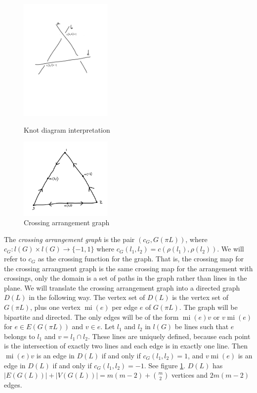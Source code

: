 \documentclass[11pt, oneside]{article}
\newcommand{\mi}{\operatorname{mi}}
\begin{document}
\begin{figure}
\begin{minipage}{0.5\linewidth}
\centering	
\includegraphics[width=0.4\textwidth]{Arrcross}
\caption{Knot diagram interpretation}
\label{fig:first}
\end{minipage}
\begin{minipage}{0.5\linewidth}
\centering
\includegraphics[width=0.4\textwidth]{Digraph}
\caption{Crossing arrangement graph}
\label{fig:second}
\end{minipage}
\end{figure}


The \emph{crossing arrangement graph} is the pair $(c_G, G(\pi L))$, where $c_G: l(G) \times l(G) \to \{-1,1\}$ where $c_G(l_1, l_2) = c(\rho(l_1), \rho(l_2))$. We will refer to $c_G$ as the crossing function for the graph. That is, the crossing map for the crossing arrangment graph is the same crossing map for the arrangement with crossings, only the domain is a set of paths in the graph rather than lines in the plane. We will translate the crossing arrangement graph into a directed graph $D(L)$ in the following way. The vertex set of $D(L)$ is the vertex set of $G(\pi L)$, plus one vertex $\mi(e)$ per edge $e$ of $G(\pi L)$. The graph will be bipartite and directed. The only edges will be of the form $\mi(e)v$ or $v \mi(e)$ for $e \in E(G(\pi L))$ and $v \in e$. Let $l_1$ and $l_2$ in $l(G)$ be lines such that $e$ belongs to $l_1$ and $v = l_1 \cap l_2$. These lines are uniquely defined, because each point is the intersection of exactly two lines and each edge is in exactly one line. Then $\mi(e)v$ is an edge in $D(L)$ if and only if $c_G(l_1, l_2) = 1$, and $v \mi(e)$ is an edge in $D(L)$ if and only if $c_G(l_1, l_2) = -1$. See figure \ref{fig:second}. $D(L)$ has $|E(G(L))| +  |V(G(L))| = m(m-2) + { m \choose 2}$ vertices and $2m(m-2)$ edges. \\
\end{document}
